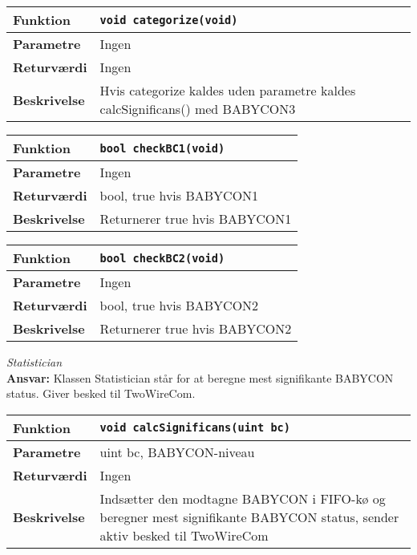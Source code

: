 \begin{center}
    \begin{tabular}{ | l | p{} |}
    \hline
    \textbf{Funktion}	& \verb+void categorize(void) +						\\ \hline
    \textbf{Parametre} 	& Ingen 								\\ \hline
    \textbf{Returværdi}	& Ingen	 								\\ \hline
    \textbf{Beskrivelse}& Hvis categorize kaldes uden parametre kaldes calcSignificans() med BABYCON3		\\ \hline
    \end{tabular}
\end{center}

\begin{center}
    \begin{tabular}{ | l | p{} |}
    \hline
    \textbf{Funktion}	& \verb+bool checkBC1(void) +						\\ \hline
    \textbf{Parametre} 	& Ingen 								\\ \hline
    \textbf{Returværdi}	& bool, true hvis BABYCON1 	 								\\ \hline
    \textbf{Beskrivelse}& Returnerer true hvis BABYCON1		\\ \hline
    \end{tabular}
\end{center}

\begin{center}
    \begin{tabular}{ | l | p{} |}
    \hline
    \textbf{Funktion}	& \verb+bool checkBC2(void) +						\\ \hline
    \textbf{Parametre} 	& Ingen 								\\ \hline
    \textbf{Returværdi}	& bool, true hvis BABYCON2 	 								\\ \hline
    \textbf{Beskrivelse}& Returnerer true hvis BABYCON2		\\ \hline
    \end{tabular}
\end{center}



\textit{Statistician} \\
\textbf{Ansvar:} Klassen Statistician står for at beregne mest signifikante BABYCON status. Giver besked til TwoWireCom. 

\begin{center}
    \begin{tabular}{ | l | p{} |}
    \hline
    \textbf{Funktion}	& \verb+void calcSignificans(uint bc) +						\\ \hline
    \textbf{Parametre} 	& uint bc, BABYCON-niveau		\\ \hline
    \textbf{Returværdi}	& Ingen	 								\\ \hline
    \textbf{Beskrivelse}& Indsætter den modtagne BABYCON i FIFO-kø og beregner mest signifikante BABYCON status, sender aktiv besked til TwoWireCom		\\ \hline
    \end{tabular}
\end{center}


